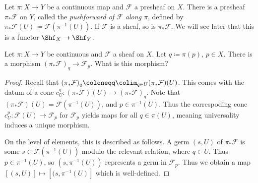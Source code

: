 \begin{definition}\label{dfn:2-2-10}
	Let $\pi : X \to Y$ be a continuous map and $\mathcal{F}$ a presheaf on $X$. There is a presheaf $\pi _*\mathcal{F} $ on $Y$, called the \emph{pushforward of $\mathcal{F} $ along $\pi $}, defined by $\pi _*\mathcal{F} (U)\coloneqq \mathcal{F} (\pi ^{-1} (U))$. If $\mathcal{F} $ is a sheaf, so is $\pi _*\mathcal{F} $. We will see later that this is a functor $\Shf _X\to \Shf _Y$.
\end{definition}

\begin{exercise}
	Let $\pi : X \to Y$ be continuous and $\mathcal{F} $ a sheaf on $X$. Let $q\coloneqq \pi (p)$, $p\in X$. There is a morphism $(\pi _*\mathcal{F} )_q\to \mathcal{F} _p$. What is this morphism?
\end{exercise}
\begin{proof}
	Recall that $(\pi _*\mathcal{F} )_q \coloneqq \colim _{q\in U} (\pi _*\mathcal{F} )(U)$. This comes with the datum of a cone $c^q_U : (\pi _*\mathcal{F}) (U) \to (\pi _*\mathcal{F} )_q$. Note that $(\pi _*\mathcal{F} )(U)=\mathcal{F} (\pi ^{-1} (U))$, and $p\in \pi ^{-1} (U)$. Thus the correspoding cone $c_U^p : \mathcal{F} (U) \to \mathcal{F} _p$ for $\mathcal{F} _p$ yields maps for all $q\in \pi (U)$, meaning universality induces a unique morphism.

	On the level of elements, this is described as follows. A germ $(s,U)$ of $\pi_*\mathcal{F} $ is some $s\in \mathcal{F} (\pi ^{-1} (U))$ modulo the relevant relation, where $q\in U$. Thus $p\in \pi ^{-1} (U)$, so $(s,\pi ^{-1} (U))$ represents a germ in $\mathcal{F} _p$. Thus we obtain a map $[(s,U)]\mapsto [(s,\pi ^{-1} (U)]$ which is well-defined.
\end{proof}

